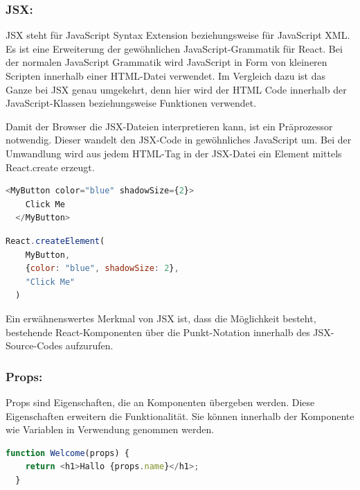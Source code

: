 \newpage

\subsubsection{JSX:}

JSX steht für JavaScript Syntax Extension beziehungsweise für JavaScript XML. Es ist eine Erweiterung der gewöhnlichen JavaScript-Grammatik für React. Bei der normalen JavaScript Grammatik wird JavaScript in Form von kleineren Scripten innerhalb einer HTML-Datei verwendet. Im Vergleich dazu ist das Ganze bei JSX genau umgekehrt, denn hier wird der HTML Code innerhalb der JavaScript-Klassen beziehungsweise Funktionen verwendet.

Damit der Browser die JSX-Dateien interpretieren kann, ist ein Präprozessor notwendig. Dieser wandelt den JSX-Code in gewöhnliches JavaScript um.
Bei der Umwandlung wird aus jedem HTML-Tag in der JSX-Datei ein Element mittels React.create erzeugt.

\cite{JSX}

\begin{lstlisting}[language=JavaScript, caption=JSX-Code, label=lst:impl:jsx]
  <MyButton color="blue" shadowSize={2}>
    Click Me
  </MyButton>
\end{lstlisting}\cite{JSX}

\begin{lstlisting}[language=JavaScript, caption=JSX-Code in gewöhnliches JavaScript kompiliert, label=lst:impl:jsxInJS]
  React.createElement(
    MyButton,
    {color: "blue", shadowSize: 2},
    "Click Me"
  )
\end{lstlisting}\cite{JSX}

Ein erwähnenswertes Merkmal von JSX ist, dass die Möglichkeit besteht, bestehende React-Komponenten über die Punkt-Notation innerhalb des JSX-Source-Codes aufzurufen.
\cite{JSX}

\subsubsection{Props:}
Props sind Eigenschaften, die an Komponenten übergeben werden. Diese Eigenschaften erweitern die Funktionalität. Sie können innerhalb der Komponente wie Variablen in Verwendung genommen werden.
\cite{PropsAndComponents} 

\begin{lstlisting}[language=JavaScript, caption=Komponente 'Welcome' die Props 'props' erwartet, label=lst:impl:componentWelcome]
  function Welcome(props) {
    return <h1>Hallo {props.name}</h1>;
  }
\end{lstlisting}\cite{PropsAndComponents}


